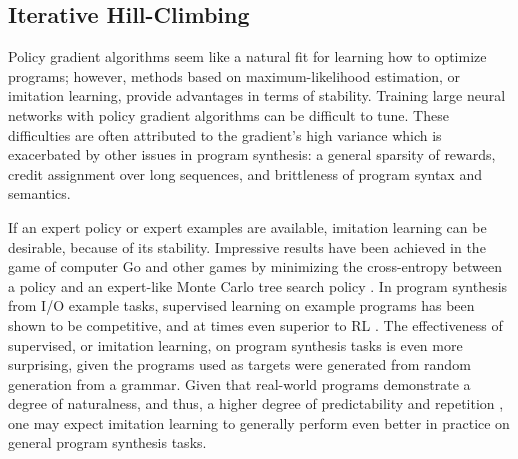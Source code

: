 \documentclass{article}
\begin{document}
\subsection{Iterative Hill-Climbing}

Policy gradient algorithms seem like a natural fit for learning how to optimize programs; however, methods based on maximum-likelihood estimation, or imitation learning, provide advantages in terms of stability. Training large neural networks with policy gradient algorithms can be difficult to tune. These difficulties are often attributed to the gradient's high variance which is exacerbated by other issues in program synthesis: a general sparsity of rewards, credit assignment over long sequences, and brittleness of program syntax and semantics. 

If an expert policy or expert examples are available, imitation learning can be desirable, because of its stability. Impressive results have been achieved in the game of computer Go and other games by minimizing the cross-entropy between a policy and an expert-like Monte Carlo tree search policy \cite{silver2017mastering}. In program synthesis from I/O example tasks, supervised learning on example programs has been shown to be competitive, and at times even superior to RL \cite{bunel2018leveraging}. The effectiveness of supervised, or imitation learning, on program synthesis tasks is even more surprising, given the programs used as targets were generated from random generation from a grammar. Given that real-world programs demonstrate a degree of naturalness, and thus, a higher degree of predictability and repetition \cite{hindle2012naturalness}, one may expect imitation learning to generally perform even better in practice on general program synthesis tasks. 

\end{document}
